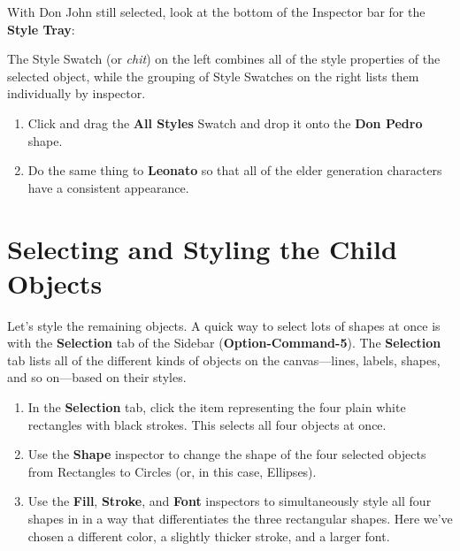 \documentclass[../main.tex]{subfiles}
\begin{document}
With Don John still selected, look at the bottom of the Inspector bar for the \textbf{Style
Tray}:


The Style Swatch (or \textit{chit}) on the left combines all of the style properties of the
selected object, while the grouping of Style Swatches on the right lists them individually by
inspector.

\begin{enumerate}
  \item Click and drag the \textbf{All Styles} Swatch and drop it onto the \textbf{Don Pedro}
    shape.


  \item Do the same thing to \textbf{Leonato} so that all of the elder generation characters
    have a consistent appearance.

\end{enumerate}

\section{Selecting and Styling the Child Objects}

Let's style the remaining objects. A quick way to select lots of shapes at once is with the
\textbf{Selection} tab of the Sidebar (\textbf{Option-Command-5}). The \textbf{Selection} tab
lists all of the different kinds of objects on the canvas---lines, labels, shapes, and so
on---based on their styles.

\begin{enumerate}
  \item In the \textbf{Selection} tab, click the item representing the four plain white
    rectangles with black strokes. This selects all four objects at once.

  \item Use the \textbf{Shape} inspector to change the shape of the four selected objects from
    Rectangles to Circles (or, in this case, Ellipses).

  \item Use the \textbf{Fill}, \textbf{Stroke}, and \textbf{Font} inspectors to simultaneously
    style all four shapes in in a way that differentiates the three rectangular shapes. Here
    we've chosen a different color, a slightly thicker stroke, and a larger font.

\end{enumerate}
\end{document}

